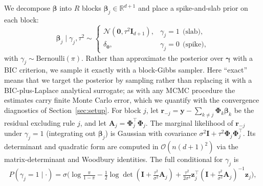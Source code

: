 \documentclass[review,1p,times]{elsarticle}
\begin{document}
We decompose $\boldsymbol{\beta}$ into $R$ blocks $\boldsymbol{\beta}_j\in\mathbb{R}^{d+1}$ and place a spike-and-slab prior on each block:
\begin{equation}
 \boldsymbol{\beta}_j \mid \gamma_j,\tau^2 \sim
 \begin{cases}
  \mathcal{N}(\mathbf{0},\tau^2\mathbf{I}_{d+1}), & \gamma_j=1 \ \ \text{(slab)},\\[3pt]
  \delta_{\mathbf{0}}, & \gamma_j=0 \ \ \text{(spike)},
 \end{cases}
 \label{eq:spikeslab}
\end{equation}
with $\gamma_j\sim\mathrm{Bernoulli}(\pi)$. Rather than approximate the posterior over $\boldsymbol{\gamma}$ with a BIC criterion, we sample it exactly with a block-Gibbs sampler. Here ``exact'' means that we target the posterior by sampling rather than replacing it with a BIC-plus-Laplace analytical surrogate; as with any MCMC procedure the estimates carry finite Monte Carlo error, which we quantify with the convergence diagnostics of Section~\ref{sec:setup}. For block $j$, let $\mathbf{r}_{-j}=\mathbf{y}-\sum_{k\neq j}\boldsymbol{\Phi}_k\boldsymbol{\beta}_k$ be the residual excluding rule $j$, and let $\mathbf{A}_j=\boldsymbol{\Phi}_j^{\top}\boldsymbol{\Phi}_j$.
The marginal likelihood of $\mathbf{r}_{-j}$ under $\gamma_j=1$ (integrating out $\boldsymbol{\beta}_j$) is Gaussian with covariance $\sigma^2\mathbf{I}+\tau^2\boldsymbol{\Phi}_j\boldsymbol{\Phi}_j^{\top}$.
Its determinant and quadratic form are computed in $\mathcal{O}(n(d+1)^2)$ via the matrix-determinant and Woodbury identities. The full conditional for $\gamma_j$ is
\begin{equation}
 P(\gamma_j=1\mid\cdot)=\sigma\!\Big(\log\tfrac{\pi}{1-\pi}
  -\tfrac12\log\det(\mathbf{I}+\tfrac{\tau^2}{\sigma^2}\mathbf{A}_j)
  +\tfrac{\tau^2}{2\sigma^4}\mathbf{z}_j^{\top}(\mathbf{I}+\tfrac{\tau^2}{\sigma^2}\mathbf{A}_j)^{-1}\mathbf{z}_j\Big),
 \label{eq:gamma}
\end{equation}
\end{document}
